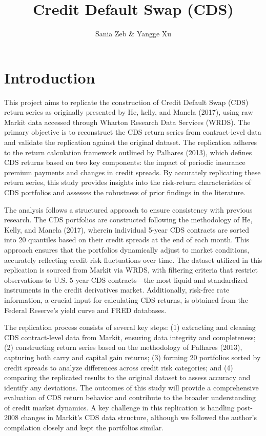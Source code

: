 \documentclass{article}
\title{Credit Default Swap (CDS)}
\author{Sania Zeb \& Yangge Xu}
\begin{document}
\maketitle

\section{Introduction}

This project aims to replicate the construction of Credit Default Swap (CDS) return series as originally presented by He, kelly, and Manela  (2017), using raw Markit data accessed through Wharton Research Data Services (WRDS). The primary objective is to reconstruct the CDS return series from contract-level data and validate the replication against the original dataset. The replication adheres to the return calculation framework outlined by Palhares (2013), which defines CDS returns based on two key components: the impact of periodic insurance premium payments and changes in credit spreads. By accurately replicating these return series, this study provides insights into the risk-return characteristics of CDS portfolios and assesses the robustness of prior findings in the literature. 


The analysis follows a structured approach to ensure consistency with previous research. The CDS portfolios are constructed following the methodology of He, Kelly, and Manela (2017), wherein individual 5-year CDS contracts are sorted into 20 quantiles based on their credit spreads at the end of each month. This approach ensures that the portfolios dynamically adjust to market conditions, accurately reflecting credit risk fluctuations over time. The dataset utilized in this replication is sourced from Markit via WRDS, with filtering criteria that restrict observations to U.S. 5-year CDS contracts—the most liquid and standardized instruments in the credit derivatives market. Additionally, risk-free rate information, a crucial input for calculating CDS returns, is obtained from the Federal Reserve's yield curve and FRED databases. 


The replication process consists of several key steps: (1) extracting and cleaning CDS contract-level data from Markit, ensuring data integrity and completeness; (2) constructing return series based on the methodology of Palhares (2013), capturing both carry and capital gain returns; (3) forming 20 portfolios sorted by credit spreads to analyze differences across credit risk categories; and (4) comparing the replicated results to the original dataset to assess accuracy and identify any deviations. The outcomes of this study will provide a comprehensive evaluation of CDS return behavior and contribute to the broader understanding of credit market dynamics. A key challenge in this replication is handling post-2008 changes in Markit's CDS data structure, although we followed the author's compilation closely and kept the portfolios similar.
\end{document}
